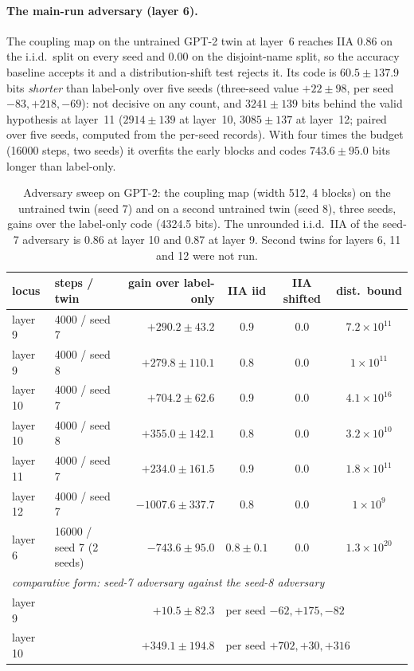 \documentclass[11pt,a4paper]{article}
\begin{document}
\paragraph{The main-run adversary (layer 6).} The coupling map on the untrained GPT-2 twin at layer~6 reaches IIA 0.86 on the i.i.d.\ split on every seed and 0.00 on the disjoint-name split, so the accuracy baseline accepts it and a distribution-shift test rejects it. Its code is $60.5\pm137.9$ bits \emph{shorter} than label-only over five seeds (three-seed value $+22\pm98$, per seed $-83,+218,-69$): not decisive on any count, and $3241\pm139$ bits behind the valid hypothesis at layer~11 ($2914\pm139$ at layer~10, $3085\pm137$ at layer~12; paired over five seeds, computed from the per-seed records). With four times the budget (16000 steps, two seeds) it overfits the early blocks and codes $743.6\pm95.0$ bits longer than label-only.

\begin{table}[htbp]
\centering\small
\caption{Adversary sweep on GPT-2: the coupling map (width 512, 4 blocks) on the untrained twin (seed 7) and on a second untrained twin (seed 8), three seeds, gains over the label-only code (4324.5 bits). The unrounded i.i.d.\ IIA of the seed-7 adversary is 0.86 at layer 10 and 0.87 at layer 9. Second twins for layers 6, 11 and 12 were not run.}
\label{tab:adv}
\begin{tabular}{llrccc}
\toprule
locus & steps / twin & gain over label-only & IIA iid & IIA shifted & dist.\ bound\\
\midrule
layer 9 & 4000 / seed 7 & $+290.2\pm43.2$ & 0.9 & 0.0 & $7.2\times10^{11}$\\
layer 9 & 4000 / seed 8 & $+279.8\pm110.1$ & 0.8 & 0.0 & $1\times10^{11}$\\
layer 10 & 4000 / seed 7 & $+704.2\pm62.6$ & 0.9 & 0.0 & $4.1\times10^{16}$\\
layer 10 & 4000 / seed 8 & $+355.0\pm142.1$ & 0.8 & 0.0 & $3.2\times10^{10}$\\
layer 11 & 4000 / seed 7 & $+234.0\pm161.5$ & 0.9 & 0.0 & $1.8\times10^{11}$\\
layer 12 & 4000 / seed 7 & $-1007.6\pm337.7$ & 0.8 & 0.0 & $1\times10^{9}$\\
layer 6 & 16000 / seed 7 (2 seeds) & $-743.6\pm95.0$ & $0.8\pm0.1$ & 0.0 & $1.3\times10^{20}$\\
\midrule
\multicolumn{6}{l}{\emph{comparative form: seed-7 adversary against the seed-8 adversary}}\\
layer 9 & & $+10.5\pm82.3$ & \multicolumn{3}{l}{per seed $-62,+175,-82$}\\
layer 10 & & $+349.1\pm194.8$ & \multicolumn{3}{l}{per seed $+702,+30,+316$}\\
\bottomrule
\end{tabular}
\end{table}
\end{document}
